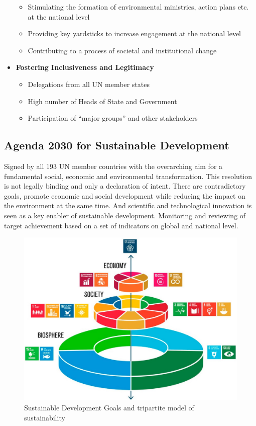 \documentclass[11pt]{article}
\theoremstyle{definition}
\begin{document}
\begin{itemize}[noitemsep]
\begin{itemize}
		\item Stimulating the formation of environmental ministries, action plans etc. at the national level
		\item Providing key yardsticks to increase engagement at the national level
		\item Contributing to a process of societal and institutional change
	\end{itemize}
	\item \textbf{Fostering Inclusiveness and Legitimacy}
	\begin{itemize}
		\item Delegations from all UN member states
		\item High number of Heads of State and Government
		\item Participation of “major groups” and other stakeholders
	\end{itemize}
\end{itemize}

\subsection{Agenda 2030 for Sustainable Development}
Signed by all 193 UN member countries with the overarching aim for a fundamental social, economic and environmental transformation. This resolution is not legally binding and only a declaration of intent. There are contradictory goals, promote economic and social development while reducing the impact on the environment at the same time. And scientific and technological innovation is seen as a key enabler of sustainable development. Monitoring and reviewing of target achievement based on a set of indicators on global and national level.

\begin{figure}[H]
	\centering
	\includegraphics[width=0.6\linewidth]{img/tripartite_model_sustainability}
	\caption{Sustainable Development Goals and tripartite model of sustainability}
	\label{fig:tripartitemodelsustainability}
\end{figure}
\end{document}
